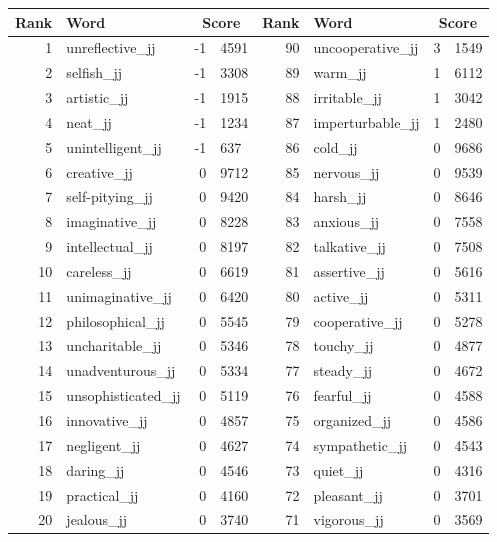 \begin{table}[tbp]
    \begin{tabular}{| rlr@{.}l | rlr@{.}l |}
    \hline
    \textbf{Rank} & \textbf{Word} & \multicolumn{2}{c|}{\textbf{Score}} & \textbf{Rank} & \textbf{Word} & \multicolumn{2}{c|}{\textbf{Score}} \\
    \hline
    1 & unreflective\_jj & -1 & 4591    &    90 & uncooperative\_jj & 3 & 1549 \\
    2 & selfish\_jj & -1 & 3308    &    89 & warm\_jj & 1 & 6112 \\
    3 & artistic\_jj & -1 & 1915    &    88 & irritable\_jj & 1 & 3042 \\
    4 & neat\_jj & -1 & 1234    &    87 & imperturbable\_jj & 1 & 2480 \\
    5 & unintelligent\_jj & -1 & 637    &    86 & cold\_jj & 0 & 9686 \\
    6 & creative\_jj & 0 & 9712    &    85 & nervous\_jj & 0 & 9539 \\
    7 & self-pitying\_jj & 0 & 9420    &    84 & harsh\_jj & 0 & 8646 \\
    8 & imaginative\_jj & 0 & 8228    &    83 & anxious\_jj & 0 & 7558 \\
    9 & intellectual\_jj & 0 & 8197    &    82 & talkative\_jj & 0 & 7508 \\
    10 & careless\_jj & 0 & 6619    &    81 & assertive\_jj & 0 & 5616 \\
    11 & unimaginative\_jj & 0 & 6420    &    80 & active\_jj & 0 & 5311 \\
    12 & philosophical\_jj & 0 & 5545    &    79 & cooperative\_jj & 0 & 5278 \\
    13 & uncharitable\_jj & 0 & 5346    &    78 & touchy\_jj & 0 & 4877 \\
    14 & unadventurous\_jj & 0 & 5334    &    77 & steady\_jj & 0 & 4672 \\
    15 & unsophisticated\_jj & 0 & 5119    &    76 & fearful\_jj & 0 & 4588 \\
    16 & innovative\_jj & 0 & 4857    &    75 & organized\_jj & 0 & 4586 \\
    17 & negligent\_jj & 0 & 4627    &    74 & sympathetic\_jj & 0 & 4543 \\
    18 & daring\_jj & 0 & 4546    &    73 & quiet\_jj & 0 & 4316 \\
    19 & practical\_jj & 0 & 4160    &    72 & pleasant\_jj & 0 & 3701 \\
    20 & jealous\_jj & 0 & 3740    &    71 & vigorous\_jj & 0 & 3569 \\

\end{tabular}
\end{table}
